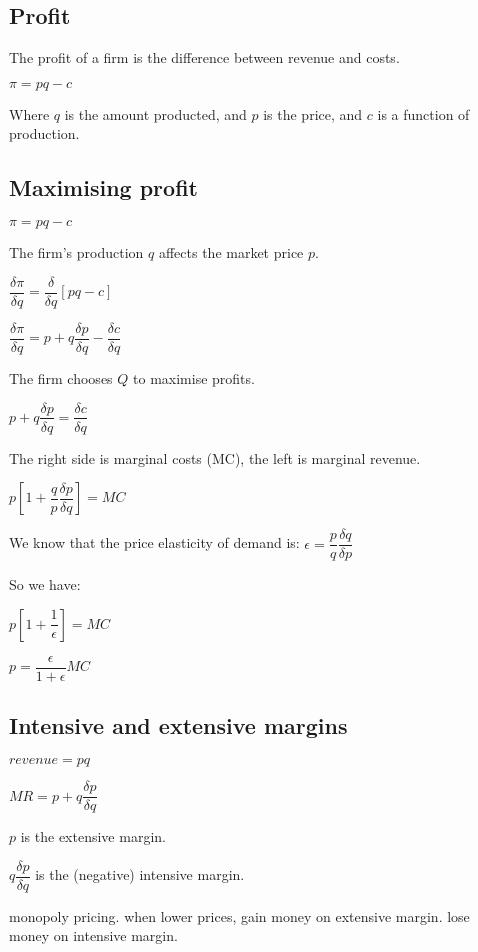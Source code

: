 
\subsection{Profit}

The profit of a firm is the difference between revenue and costs.

\(\pi = pq-c\)

Where \(q\) is the amount producted, and \(p\) is the price, and \(c\) is a function of production.

\subsection{Maximising profit}

\(\pi = pq-c\)

The firm's production \(q\) affects the market price \(p\).

\(\dfrac{\delta \pi }{\delta q}= \dfrac{\delta }{\delta q} [pq-c]\)

\(\dfrac{\delta \pi }{\delta q}= p+q\dfrac{\delta p}{\delta q}-\dfrac{\delta c}{\delta q}\)

The firm chooses \(Q\) to maximise profits.

\(p+q\dfrac{\delta p}{\delta q}=\dfrac{\delta c}{\delta q}\)

The right side is marginal costs (MC), the left is marginal revenue.

\(p[1+\dfrac{q}{p}\dfrac{\delta p}{\delta q}]=MC\)

We know that the price elasticity of demand is: \(\epsilon = \dfrac{p}{q}\dfrac{\delta q}{\delta p}\)

So we have:

\(p[1+\dfrac{1 }{\epsilon }]=MC\)

\(p=\dfrac{\epsilon }{1+\epsilon }MC\)

\subsection{Intensive and extensive margins}

\(revenue = pq\)

\(MR=p +q\dfrac{\delta p}{\delta q}\)

\(p\) is the extensive margin.

\(q\dfrac{\delta p}{\delta q}\) is the (negative) intensive margin.

monopoly pricing. when lower prices, gain money on extensive margin. lose money on intensive margin.

